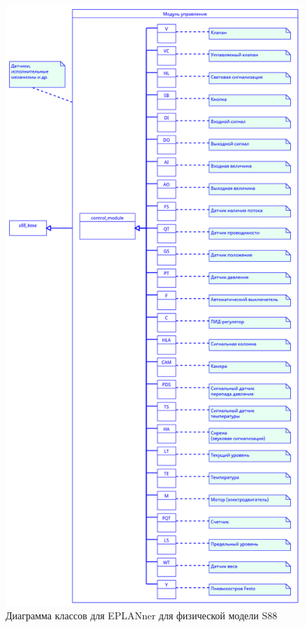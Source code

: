 \begin{figure}[H]
    \centering
    \includegraphics[height=0.9\textheight]{images/chapter_4/s88_control_modules.png}
    \caption{Диаграмма классов для EPLANner для физической модели S88}
    \label{fig:s88_control_modules}
\end{figure}

